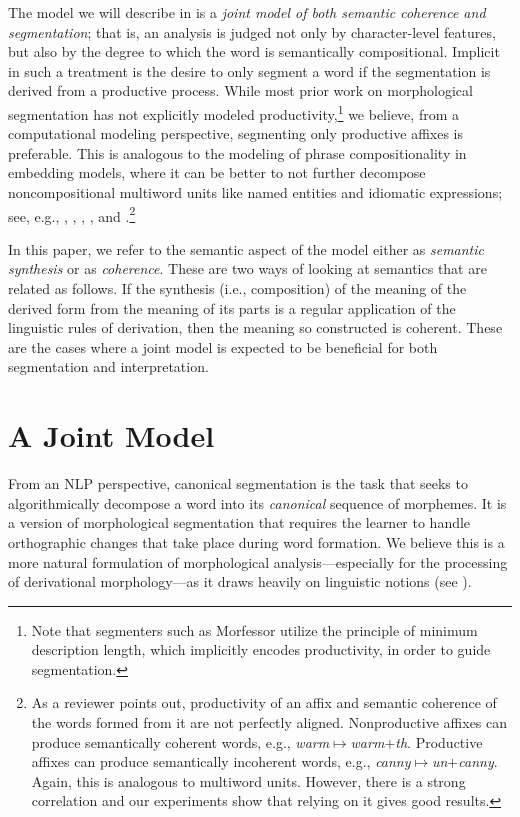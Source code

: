 \documentclass[11pt,letterpaper]{article}
\newcommand{\word}[1]{{\em #1}}
\begin{document}
The model we will describe in  is a \emph{joint model of both
semantic coherence and segmentation}; that is, an analysis is judged
not only by character-level features, but also by the degree to which
the word is semantically compositional. Implicit in such a treatment
is the desire to only segment a word if the segmentation is derived
from a productive process. While most prior work on morphological segmentation
has not explicitly modeled productivity,\footnote{Note that segmenters such as {\sc Morfessor} utilize the principle of minimum description length, which implicitly encodes productivity, in order to guide segmentation.}
we believe, from a computational modeling perspective, segmenting only
productive affixes is preferable. This is analogous to the modeling
of phrase compositionality in embedding models, where 
it can be better to
not further decompose
noncompositional multiword units like named entities and
idiomatic expressions; see, e.g.,
, , , , and .\footnote{As
  a reviewer points out, productivity of an affix and
  semantic coherence of the words formed from it are not
  perfectly aligned. Nonproductive affixes can produce
  semantically coherent words, e.g., 
\word{warm}$\mapsto$\word{warm}$+$\word{th}. Productive
affixes can produce semantically incoherent words, e.g., 
\word{canny}$\mapsto$\word{un}$+$\word{canny}. Again, this
is analogous to multiword units. However, there is a strong
correlation and our experiments show that relying
on it gives good results.}


In this paper, we refer to the semantic aspect of the model
either as \emph{semantic synthesis} or as \emph{coherence}.
These are two ways of looking at semantics that are
related as follows.  If the synthesis (i.e., composition) of
the meaning of the derived form from the meaning of its
parts is a regular application of the linguistic rules of
derivation, then the meaning so constructed is coherent.
These are the cases where a joint model is expected to be
beneficial for both segmentation and interpretation.

\section{A Joint Model}
From an NLP perspective, canonical segmentation
\cite{naradowsky2009improving,cotterell2016canonical} is the task
that seeks to algorithmically decompose a word into its {\em canonical} sequence of
morphemes. It is a version of morphological segmentation that requires
the learner to handle orthographic changes that take place during word formation.
We believe this is a more natural formulation of morphological
analysis---especially for the processing of derivational morphology---as it draws heavily on linguistic notions (see ).
\end{document}
